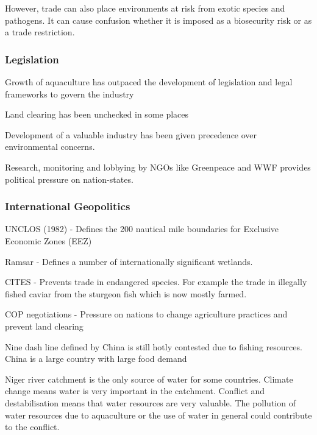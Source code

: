 				However, trade can also place environments at risk from exotic species and pathogens. It can cause confusion whether it is imposed as a biosecurity risk or as a trade restriction.

			\subsubsection{Legislation}
				Growth of aquaculture has outpaced the development of legislation and legal frameworks to govern the industry

				Land clearing has been unchecked in some places

				Development of a valuable industry has been given precedence over environmental concerns.

				Research, monitoring and lobbying by NGOs like Greenpeace and WWF provides political pressure on nation-states.

			\subsubsection{International Geopolitics}
				UNCLOS (1982) - Defines the 200 nautical mile boundaries for Exclusive Economic Zones (EEZ)

				Ramsar - Defines a number of internationally significant wetlands.

				CITES - Prevents trade in endangered species. For example the trade in illegally fished caviar from the sturgeon fish which is now mostly farmed.

				COP negotiations - Pressure on nations to change agriculture practices and prevent land clearing

				Nine dash line defined by China is still hotly contested due to fishing resources. China is a large country with large food demand

				Niger river catchment is the only source of water for some countries. Climate change means water is very important in the catchment. Conflict and destabilisation means that water resources are very valuable. The pollution of water resources due to aquaculture or the use of water in general could contribute to the conflict.

